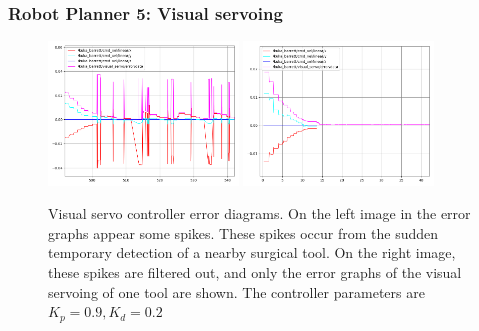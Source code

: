 \begin{frame}
\frametitle{Robot Planner 5: Visual servoing}
\begin{center}
\begin{figure}[!htb]
\centering
\includegraphics[width=0.45\textwidth]{../images/robot_planner5/visual_servo_controller3.png}
\includegraphics[width=0.45\textwidth]{../images/robot_planner5/visual_servo_controller4.png}\\
\caption{Visual servo controller error diagrams. On the left image in the error graphs appear some spikes. These spikes occur from the sudden temporary detection 
of a nearby surgical tool. On the right image, these spikes are filtered out, and only the error graphs of the visual servoing of one tool are shown. The  
controller parameters are $K_p = 0.9, K_d = 0.2$}
\end{figure}
\end{center}
\end{frame}

